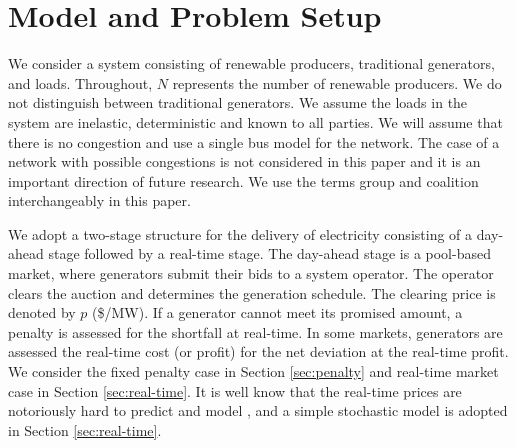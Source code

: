 \documentclass[journal]{IEEEtran}
\begin{document}
	   

 

\section{Model and Problem Setup}
We consider a system consisting of renewable producers, traditional generators, and loads. Throughout, $N$ represents the number of renewable producers. We do not distinguish between traditional generators. We assume the loads in the system are inelastic, deterministic and known to all parties. We will assume that there is no congestion and use a single bus model for the network. The case of a network with possible congestions is not considered in this paper and it is an important direction of future research. We use the terms group and coalition interchangeably in this paper. 

We adopt a two-stage structure for the delivery of electricity consisting of a day-ahead stage followed by a real-time stage. The day-ahead stage is a pool-based market, where generators submit their bids to a system operator. The operator clears the auction and determines the generation schedule. The clearing price is denoted by $p$ (\$/MW). If a generator cannot meet its promised amount, a penalty is assessed for the shortfall at real-time.  In some markets, generators are assessed the real-time cost (or profit) for the net deviation at the real-time profit. We consider the fixed penalty case in Section \ref{sec:penalty} and real-time market case in Section \ref{sec:real-time}.  It is well know that the real-time prices are notoriously hard to predict and model \cite{Astaneh13,Allcott11}, and a simple stochastic model is adopted in Section \ref{sec:real-time}. 

   
\end{document}
